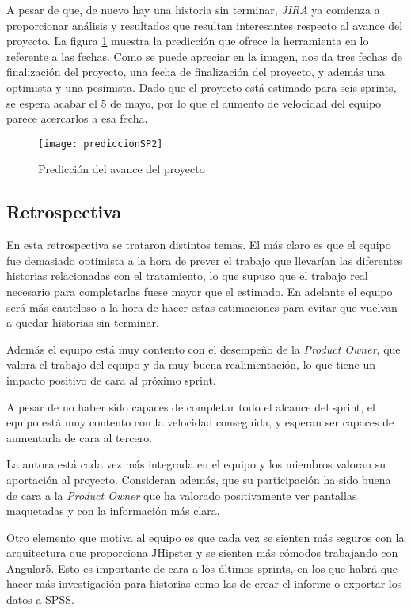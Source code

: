 A pesar de que, de nuevo hay una historia sin terminar, \emph{JIRA} ya comienza a proporcionar análisis y resultados que resultan interesantes respecto al avance del proyecto. La figura \ref{fig:prediccionSP2} muestra la predicción que ofrece la herramienta en lo referente a las fechas. Como se puede apreciar en la imagen, nos da tres fechas de finalización del proyecto, una fecha de finalización del proyecto, y además una optimista y una pesimista. Dado que el proyecto está estimado para seis sprints, se espera acabar el 5 de mayo, por lo que el aumento de velocidad del equipo parece acercarlos a esa fecha.

\begin{figure}[!h]
\begin{center}
\texttt{[image: prediccionSP2]}
\caption{Predicción del avance del proyecto}
\label{fig:prediccionSP2}
\end{center}
\end{figure}


\subsection{Retrospectiva}
\label{subsec:S2-Retrospectiva}

En esta retrospectiva se trataron distintos temas. El más claro es que el equipo fue demasiado optimista a la hora de prever el trabajo que llevarían las diferentes historias relacionadas con el tratamiento, lo que supuso que el trabajo real necesario para completarlas fuese mayor que el estimado. En adelante el equipo será más cauteloso a la hora de hacer estas estimaciones para evitar que vuelvan a quedar historias sin terminar.

Además el equipo está muy contento con el desempeño de la \emph{Product Owner}, que valora el trabajo del equipo y da muy buena realimentación, lo que tiene un impacto positivo de cara al próximo sprint.

A pesar de no haber sido capaces de completar todo el alcance del sprint, el equipo está muy contento con la velocidad conseguida, y esperan ser capaces de aumentarla de cara al tercero.

La autora está cada vez más integrada en el equipo y los miembros valoran su aportación al proyecto. Consideran además, que su participación ha sido buena de cara a la \emph{Product Owner} que ha valorado positivamente ver pantallas maquetadas y con la información más clara.

Otro elemento que motiva al equipo es que cada vez se sienten más seguros con la arquitectura que proporciona JHipster y se sienten más cómodos trabajando con Angular5. Esto es importante de cara a los últimos sprints, en los que habrá que hacer más investigación para historias como las de crear el informe o exportar los datos a SPSS.


